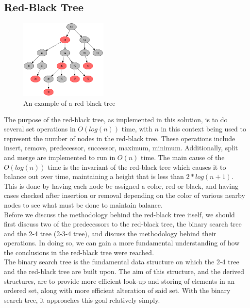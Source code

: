 \documentclass{article}
\begin{document}
\subsection{Red-Black Tree}


\begin{figure}[ht]
    \centering
    \includegraphics[height = 4cm]{examplerbtree.png}
    \caption{An example of a red black tree}
\end{figure}

\noindent
The purpose of the red-black tree, as implemented in this solution, is to do several set operations in $O(log(n))$ time, with $n$ in this context being used to represent the number of nodes in the red-black tree. These operations include insert, remove, predecessor, successor, maximum, minimum. Additionally, split and merge are implemented to run in $O(n)$ time. The main cause of the $O(log(n))$ time is the invariant of the red-black tree which causes it to balance out over time, maintaining a height that is less than $2*log(n+1)$. This is done by having each node be assigned a color, red or black, and having cases checked after insertion or removal depending on the color of various nearby nodes to see what must be done to maintain balance.
\\

\noindent
Before we discuss the methodology behind the red-black tree itself, we should first discuss two of the predecessors to the red-black tree, the binary search tree and the 2-4 tree (2-3-4 tree), and discuss the methodology behind their operations. In doing so, we can gain a more fundamental understanding of how the conclusions in the red-black tree were reached.
\\

\noindent
The binary search tree is the fundamental data structure on which the 2-4 tree and the red-black tree are built upon. The aim of this structure, and the derived structures, are to provide more efficient look-up and storing of elements in an ordered set, along with more efficient alteration of said set. With the binary search tree, it approaches this goal relatively simply.
\\
\end{document}
